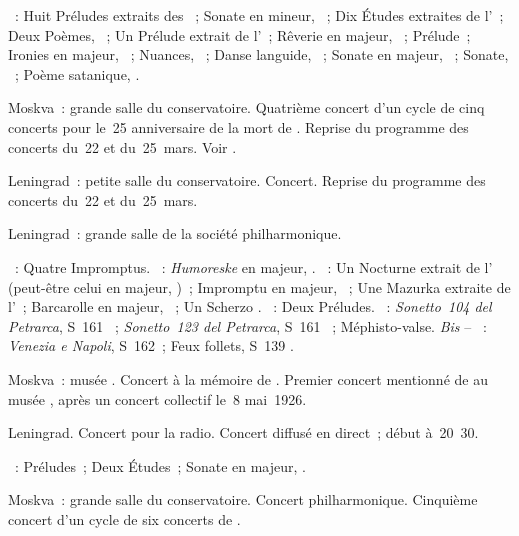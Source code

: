 \begin{description}
 \textsc{\Scriabine{}}~: Huit Préludes extraits des ~; Sonate en \kF \Sharp mineur, ~; Dix Études extraites de
 l'~; Deux Poèmes, ~; Un Prélude extrait de l'~;
 Rêverie en \kC majeur,  ~; Prélude~; Ironies en \kC
 majeur,  ~; Nuances,  ~; Danse
 languide,  ~; Sonate en \kF \Sharp majeur, ~;
 Sonate, ~; Poème satanique, .
 \item[\DateWithWeekDay{1940-03-27}]
 Moskva~: grande salle du conservatoire.
 Quatrième concert d'un cycle de cinq concerts pour le~25\ieme{}
 anniversaire de la mort de \Scriabine{}.
 Reprise du programme des concerts du~22 et du~25~mars.
 Voir \citet{Lazarev20}.
 \item[\DateWithWeekDay{1940-04-06}]
 Leningrad~: petite salle du conservatoire.
 Concert.
 Reprise du programme des concerts du~22 et du~25~mars.
 \item[\DateWithWeekDay{1940-04-22}]
 Leningrad~: grande salle de la société philharmonique.

 \textsc{\Schubert{}}~: Quatre Impromptus.
 \textsc{\Schumann{}}~: \emph{Humoreske} en \kB \Flat majeur, .
 \textsc{\Chopin{}}~: Un Nocturne extrait de l' (peut-être celui en
 \kF majeur, )~; Impromptu en \kG \Flat majeur, ~; Une
 Mazurka extraite de l'~; Barcarolle en \kF \Sharp majeur,
 ~; Un Scherzo \citep[selon][]{Nekrasova08}.
 \textsc{\Rachmaninov{}}~: Deux Préludes.
 \textsc{\Liszt{}}~: \emph{Sonetto~104 del Petrarca}, S~161 ~;
 \emph{Sonetto~123 del Petrarca}, S~161 ~; Méphisto-valse.
 \emph{Bis} -- \textsc{\Liszt{}}~: \emph{Venezia e Napoli}, S~162~; Feux
 follets, S~139 .
 \item[\DateWithWeekDay{1940-04-27}]
 Moskva~: musée \Scriabine{}.
 Concert à la mémoire de \Scriabine{}.
 Premier concert mentionné de \VSofronitsky{} au musée \Scriabine{}, après
 un concert collectif le~8 mai~1926.
 \item[\DateWithWeekDay{1940-04-29}]
 Leningrad.
 Concert pour la radio.
 Concert diffusé en direct~; début à~20~30.

 \textsc{\Scriabine{}}~: Préludes~; Deux Études~; Sonate en \kF \Sharp
 majeur, .
 \item[\DateWithWeekDay{1940-05-03}]
 Moskva~: grande salle du conservatoire.
 Concert philharmonique.
 Cinquième concert d'un cycle de six concerts de \VSofronitsky{}.


\end{description}
